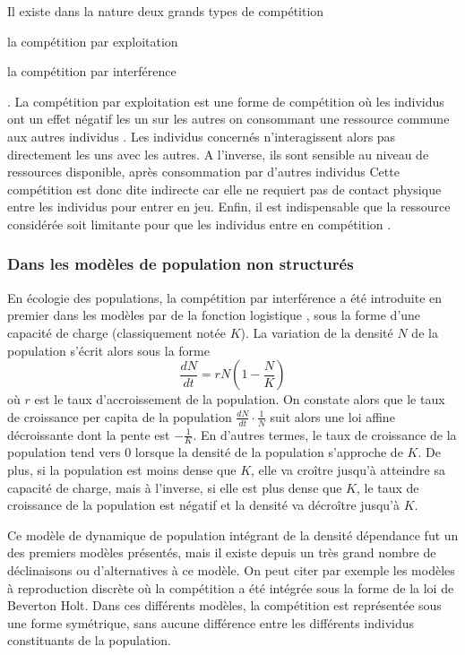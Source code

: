 Il existe dans la nature deux grands types de compétition
\begin{enumerate*}[label=(\roman*), before=\unskip{ : }, itemjoin={{ ; }},
itemjoin*={{ ; et }}] \item la compétition par exploitation \item la compétition
par interférence \end{enumerate*} \autocite{park1954a, park1962a, begon2009a}.
La compétition par exploitation est une forme de compétition où les
individus ont un effet négatif les un sur les autres on consommant une ressource
commune aux autres individus \autocite{goss-custard1980a, vance1984a,
begon2009a}. Les individus concernés n'interagissent alors pas directement les
uns avec les autres. A l'inverse, ils sont sensible au niveau de ressources
disponible, après consommation par d'autres individus Cette compétition est
donc dite indirecte car elle ne requiert pas de contact physique entre les
individus pour entrer en jeu. Enfin, il est indispensable que la ressource
considérée soit limitante pour que les individus entre en compétition
\autocite{begon2009a}. 

\subsubsection{Dans les modèles de population non structurés}

En écologie des populations, la compétition par interférence a été introduite en
premier dans les modèles par de la fonction logistique \autocite{verhulst1838a},
sous la forme d'une capacité de charge (classiquement notée $K$). La variation
de la densité $N$ de la population s'écrit alors sous la forme
$$\frac{dN}{dt}=rN \left(1-\frac{N}{K}\right)$$ où $r$ est le taux
d'accroissement de la population. On constate alors que le taux de croissance
per capita de la population $\frac{dN}{dt}\cdot \frac{1}{N}$ suit alors une loi
affine décroissante dont la pente est $-\frac{1}{K}$. En d'autres termes, le
taux de croissance de la population tend vers 0 lorsque la densité de la
population s'approche de $K$. De plus, si la population est moins dense que $K$,
elle va croître jusqu'à atteindre sa capacité de charge, mais à l'inverse, si
elle est plus dense que $K$, le taux de croissance de la population est négatif
et la densité va décroître jusqu'à $K$.

Ce modèle de dynamique de population intégrant de la densité dépendance fut un
des premiers modèles présentés, mais il existe depuis un très grand nombre de
déclinaisons ou d'alternatives à ce modèle. On peut citer par exemple les
modèles à reproduction discrète où la compétition a été intégrée sous la forme
de la loi de Beverton Holt. Dans ces différents modèles, la compétition est
représentée sous une forme symétrique, sans aucune différence entre les
différents individus constituants de la population. 

